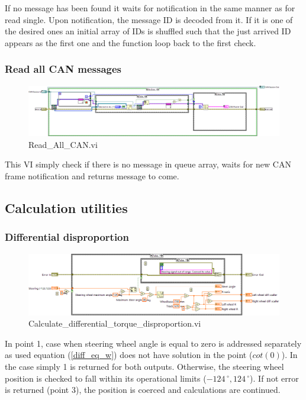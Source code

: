 If no message has been found it waits for notification in the same manner as for read single. Upon notification, the message ID is decoded from it. If it is one of the desired ones an initial array of IDs is shuffled such that the just arrived ID appears as the first one and the function loop back to the first check. 

\subsubsection{Read all CAN messages}
\begin{figure}[H]
    \centering
    \includegraphics[scale=\visc,max width=\textwidth]{figures/Read_All_CANd}
    \caption{Read\_All\_CAN.vi}
    \label{vi:Read_All_CAN}
\end{figure}
This VI simply check if there is no message in queue array, waits for new CAN frame notification and returns message to come.

\subsection{Calculation utilities}
\subsubsection{Differential disproportion} \label{sec:trq_per_wheel_calc}
\begin{figure}[H]
    \centering
    \includegraphics[scale=\visc,max width=\textwidth]{figures/Calculate_differential_torque_disproportiond}
    \caption{Calculate\_differential\_torque\_disproportion.vi}
    \label{vi:Calculate_differential_torque_disproportion}
\end{figure}
In point 1, case when steering wheel angle is equal to zero is addressed separately as used equation (\ref{diff_eq_w}) does not have solution in the point ($cot(0)$). In the case simply 1 is returned for both outputs.
Otherwise, the steering wheel position is checked to fall within its operational limits ($-124\,^{\circ},124\,^{\circ}$). If not error is returned (point 3), the position is coerced and calculations are continued.

